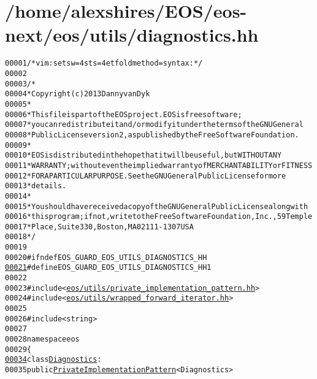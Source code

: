 \hypertarget{diagnostics_8hh_source}{
\section{/home/alexshires/EOS/eos-\/next/eos/utils/diagnostics.hh}
}


\begin{footnotesize}\begin{alltt}
00001 \textcolor{comment}{/* vim: set sw=4 sts=4 et foldmethod=syntax : */}
00002 
00003 \textcolor{comment}{/*}
00004 \textcolor{comment}{ * Copyright (c) 2013 Danny van Dyk}
00005 \textcolor{comment}{ *}
00006 \textcolor{comment}{ * This file is part of the EOS project. EOS is free software;}
00007 \textcolor{comment}{ * you can redistribute it and/or modify it under the terms of the GNU General}
00008 \textcolor{comment}{ * Public License version 2, as published by the Free Software Foundation.}
00009 \textcolor{comment}{ *}
00010 \textcolor{comment}{ * EOS is distributed in the hope that it will be useful, but WITHOUT ANY}
00011 \textcolor{comment}{ * WARRANTY; without even the implied warranty of MERCHANTABILITY or FITNESS}
00012 \textcolor{comment}{ * FOR A PARTICULAR PURPOSE.  See the GNU General Public License for more}
00013 \textcolor{comment}{ * details.}
00014 \textcolor{comment}{ *}
00015 \textcolor{comment}{ * You should have received a copy of the GNU General Public License along with}
00016 \textcolor{comment}{ * this program; if not, write to the Free Software Foundation, Inc., 59 Temple}
00017 \textcolor{comment}{ * Place, Suite 330, Boston, MA  02111-1307  USA}
00018 \textcolor{comment}{ */}
00019 
00020 \textcolor{preprocessor}{#ifndef EOS\_GUARD\_EOS\_UTILS\_DIAGNOSTICS\_HH}
\hypertarget{diagnostics_8hh_source_l00021}{}\hyperlink{diagnostics_8hh_ad3a277bda2d0cfec14d99b448eca7fd6}{00021} \textcolor{preprocessor}{}\textcolor{preprocessor}{#define EOS\_GUARD\_EOS\_UTILS\_DIAGNOSTICS\_HH 1}
00022 \textcolor{preprocessor}{}
00023 \textcolor{preprocessor}{#include <\hyperlink{private__implementation__pattern_8hh}{eos/utils/private_implementation_pattern.hh}>}
00024 \textcolor{preprocessor}{#include <\hyperlink{wrapped__forward__iterator_8hh}{eos/utils/wrapped_forward_iterator.hh}>}
00025 
00026 \textcolor{preprocessor}{#include <string>}
00027 
00028 \textcolor{keyword}{namespace }eos
00029 \{
\hypertarget{diagnostics_8hh_source_l00034}{}\hyperlink{classeos_1_1Diagnostics}{00034}     \textcolor{keyword}{class }\hyperlink{classeos_1_1Diagnostics}{Diagnostics} :
00035         \textcolor{keyword}{public} \hyperlink{classeos_1_1PrivateImplementationPattern}{PrivateImplementationPattern}<Diagnostics>

\end{alltt}
\end{footnotesize}
